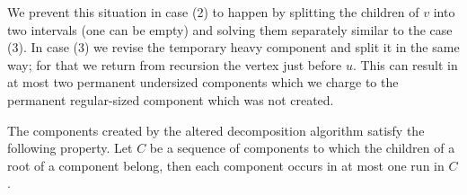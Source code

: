 We prevent this situation in case (2) to happen by splitting the children of $v$ into two intervals (one can be empty) and solving them separately similar to the case (3).
In case (3) we revise the temporary heavy component and split it in the same way; for that we return from recursion the vertex just before $u$.
This can result in at most two permanent undersized components which we charge to the permanent regular-sized component which was not created.

\begin{lemma}\label{l:decompose-property}
	The components created by the altered decomposition algorithm satisfy the following property.
	Let $C$ be a sequence of components to which the children of a root of a component belong, then each component occurs in at most one run in $C$.
\end{lemma}

